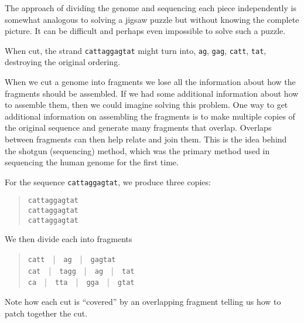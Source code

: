 \begin{note}
The approach of dividing the genome and sequencing each piece
independently is somewhat analogous to solving a jigsaw puzzle but
without knowing the complete picture.
%
It can be difficult and perhaps even impossible to solve such a
puzzle.
\end{note}

\begin{example}
When cut, the strand \texttt{cattaggagtat} might turn into,
\texttt{ag}, \texttt{gag}, \texttt{catt}, \texttt{tat}, destroying the
original ordering.
\end{example}

\begin{gram}
When we cut a genome into fragments we lose all the information
about how the fragments should be assembled.
%
If we had some additional information about how to assemble them, then
we could imagine solving this problem.
%
One way to get additional information on assembling the fragments is
to make multiple copies of the original sequence and generate many
fragments that overlap.
%
Overlaps between fragments can then help relate and join them.
%
This is the idea behind the shotgun (sequencing) method, which was the
primary method used in sequencing the human genome for the first time.
\end{gram}

\begin{example}
For the sequence
%
\texttt{cattaggagtat}, 
%
we produce three copies:

\begin{quote}
\texttt{cattaggagtat}\\
\texttt{cattaggagtat}\\
\texttt{cattaggagtat}
\end{quote}

We then divide each into fragments
%
\begin{quote}
\texttt{catt}~~|~~\texttt{ag}~~|~~\texttt{gagtat}
\\
\texttt{cat}~~|~~\texttt{tagg}~~|~~\texttt{ag}~~|~~\texttt{tat}
\\
\texttt{ca}~~|~~\texttt{tta}~~|~~\texttt{gga}~~|~~\texttt{gtat}
\end{quote}
 
Note how each cut is ``covered'' by an overlapping fragment telling us
how to patch together the cut.

\end{example}

